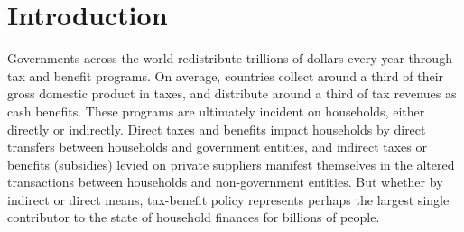 \documentclass{article}
\begin{document}





% 
% 

\section{Introduction}
Governments across the world redistribute trillions of dollars every year through tax and benefit programs. On average, countries collect around a third of their gross domestic product in taxes, and distribute around a third of tax revenues as cash benefits. These programs are ultimately incident on households, either directly or indirectly. Direct taxes and benefits impact households by direct transfers between households and government entities, and indirect taxes or benefits (subsidies) levied on private suppliers manifest themselves in the altered transactions between households and non-government entities. But whether by indirect or direct means, tax-benefit policy represents perhaps the largest single contributor to the state of household finances for billions of people. 
\end{document}
